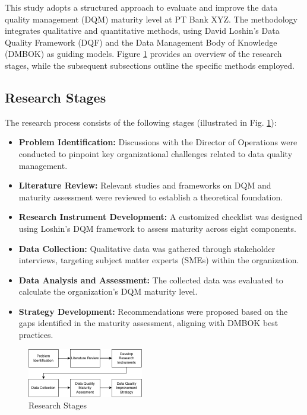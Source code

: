 \documentclass[conference]{IEEEtran}
\begin{document}
This study adopts a structured approach to evaluate and improve the data quality management (DQM) maturity level at PT Bank XYZ. The methodology integrates qualitative and quantitative methods, using David Loshin’s Data Quality Framework (DQF) and the Data Management Body of Knowledge (DMBOK) as guiding models. Figure \ref{fig:research-stages} provides an overview of the research stages, while the subsequent subsections outline the specific methods employed.

\subsection{Research Stages}

The research process consists of the following stages (illustrated in Fig. \ref{fig:research-stages}):
\begin{itemize}
    \item \textbf{Problem Identification:} Discussions with the Director of Operations were conducted to pinpoint key organizational challenges related to data quality management.
    \item \textbf{Literature Review:} Relevant studies and frameworks on DQM and maturity assessment were reviewed to establish a theoretical foundation.
    \item \textbf{Research Instrument Development:} A customized checklist was designed using Loshin’s DQM framework to assess maturity across eight components.
    \item \textbf{Data Collection:} Qualitative data was gathered through stakeholder interviews, targeting subject matter experts (SMEs) within the organization.
    \item \textbf{Data Analysis and Assessment:} The collected data was evaluated to calculate the organization’s DQM maturity level.
    \item \textbf{Strategy Development:} Recommendations were proposed based on the gaps identified in the maturity assessment, aligning with DMBOK best practices.
\end{itemize}

\begin{figure}[h]
\centerline{\includegraphics[width=0.45\textwidth]{figures/AlurPenelitian.png}}
\caption{Research Stages}
\label{fig:research-stages}
\end{figure}
\end{document}
